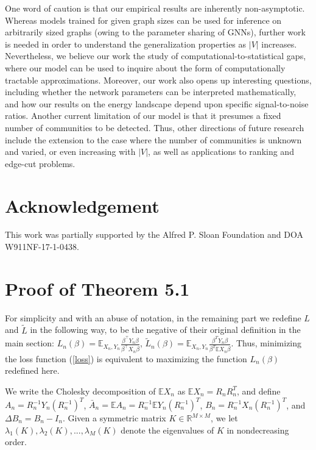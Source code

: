\documentclass{article} \usepackage{iclr2019_conference,times}
\newcommand{\expe}{\mathbb{E}}
\begin{document}
One word of caution is that our empirical results are inherently non-asymptotic. Whereas models trained for given graph sizes can be used for inference on arbitrarily sized graphs (owing to the parameter sharing of GNNs), further work is needed in order to understand the generalization properties as $|V|$ increases. 
Nevertheless, we believe our work the study of computational-to-statistical gaps, where our model can be used to inquire about the form of computationally tractable approximations. Moreover, our work also opens up interesting questions, including whether the network parameters can be interpreted mathematically, and how our results on the energy landscape depend upon specific signal-to-noise ratios. 
Another current limitation of our model is that it presumes a fixed number of communities to be detected. Thus, other directions of future research include the extension to the case where the number of communities is unknown and varied, or even increasing with $|V|$, as well as applications to ranking and edge-cut problems. 



\section{Acknowledgement}
This work was partially supported by the Alfred P. Sloan Foundation and DOA W911NF-17-1-0438.






\appendix

\section{Proof of Theorem 5.1}







For simplicity and with an abuse of notation, in the remaining part we redefine $L$ and $\tilde{L}$ in the following way, to be the negative of their original definition in the main section: $L_n(\beta) =\mathbb{E}_{X_n,Y_n} \frac{\beta^\top Y_n \beta}{ \beta^\top X_n \beta}$, $\tilde{L}_n(\beta) = \expe_{X_n, Y_n} \frac{\beta^T Y_n \beta}{\beta^T \expe X_n \beta}$. Thus, minimizing the loss function (\ref{loss}) is equivalent to maximizing the function $L_n(\beta)$ redefined here.

We write the Cholesky decomposition of $\expe X_n$ as $\expe X_n = R_n R_n^T$, and define $A_n = R_n^{-1} Y_n (R_n^{-1})^T$, $\bar{A}_n = \expe A_n = R_n^{-1} \expe Y_n (R_n^{-1})^T$, $B_n = R_n^{-1} X_n (R_n^{-1})^T$, and $\Delta B_n = B_n - I_n$. Given a symmetric matrix $K \in \mathbb{R}^{M \times M}$, we let $\lambda_1(K), \lambda_2(K), ..., \lambda_M(K)$ denote the eigenvalues of $K$ in nondecreasing order.
\end{document}
